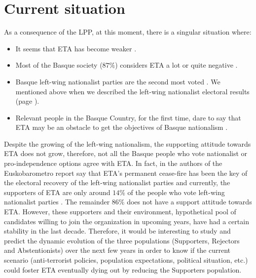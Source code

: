 \section{Current situation}\label{reduccion}
As a consequence of the LPP, at this moment, there is a singular situation where: 

\begin{itemize}
\item It seems that ETA has become weaker \cite{Harmon, debil1, debil2, debil3}.
\item Most of the Basque society ($87\%$) considers ETA a lot or quite negative \cite[p. 57]{euskoNOV2012}.    
\item Basque left-wing nationalist parties are the second most voted \cite{mir, ev2012}. We mentioned above when we described the left-wing nationalist electoral results (page \pageref{datosElec}).
\item Relevant people in the Basque Country, for the first time, dare to say that ETA may be an obstacle to get the objectives of Basque nationalism \cite{obstaculo}. 
\end{itemize}

Despite the growing of the left-wing nationalism, the supporting attitude towards ETA does not grow, therefore, not all the Basque people who vote nationalist or pro-independence options agree with ETA. In fact, in \cite[p. 57]{euskoNOV2012} the authors of the Euskobarometro report say that ETA's permanent cease-fire has been the key of the electoral recovery of the left-wing nationalist parties and currently, the supporters of ETA are only around $14\%$ of the people who vote left-wing nationalist parties \cite[p. 56-57]{euskoNOV2012}. The remainder $86\%$ does not have a support attitude towards ETA. However, these supporters and their environment, hypothetical pool of candidates willing to join the organization in upcoming years, have had a certain stability in the last decade. Therefore, it would be interesting to study and predict the dynamic evolution of the three populations (Supporters, Rejectors and Abstentionists) over the next few years in order to know if the current scenario (anti-terrorist policies, population expectations, political situation, etc.) could foster ETA eventually dying out by reducing the Supporters population.


